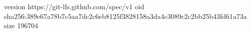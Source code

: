 version https://git-lfs.github.com/spec/v1
oid sha256:389e67a78b7c5aa7dc2c6eb8125f3828158a3da4c3089c2c2bb25b43fd61a73a
size 196704
